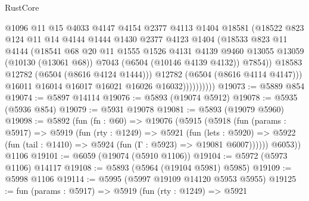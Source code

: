 \begin{lexlean}{RustCore}
\begin{coremodule}
                          @1096
                          @11
                          @15
                          @4033
                          @4147
                          @4154
                          @2377
                          @4113
                          @1404
                          @18581
                          (@18522
                            @823
                            @124
                            @11
                            @14
                            @4144
                            @1444
                            @1430
                            @2377
                            @4123
                            @1404
                            (@18533
                              @823
                              @11
                              @4144
                              (@18541
                                @68
                                @20
                                @11
                                @1555
                                @1526
                                @4131
                                @4139
                                @9460
                                @13055
                                @13059
                                (@10130 (@13061 @68))
                                @7043
                                (@6504 (@10146 @4139 @4132))
                                @7854))
                            @18583
                            @12782
                            (@6504 (@8616 @4124 @1444)))
                          @12782
                          (@6504 (@8616 @4114 @4147)))
                        @16011
                        @16014
                        @16017
                        @16021
                        @16026
                        @16032))))))))))
@19073 := @5889 @854
@19074 := @5897 @14114
@19076 := @5893 (@19074 @5912)
@19078 := @5935 (@5936 @854)
@19079 := @5931 @19078
@19081 := @5893 (@19079 @5960)
@19098 := @5892
    (fun (fn : @60) =>
    @19076
      (@5915
        (@5918
          (fun (params : @5917) =>
          @5919
            (fun (rty : @1249) =>
            @5921
              (fun (lets : @5920) =>
              @5922 (fun (tail : @1410) => @5924 (fun (Γ : @5923) => @19081 @6007))))))
        @6053))
    @1106
@19101 := @6059 (@19074 (@5910 @1106))
@19104 := @5972 (@5973 @1106) @14117
@19108 := @5893 (@5964 (@19104 @5981) @5985)
@19109 := @5998 @1106
@19114 := @5995 (@5997 @19109 @14120 @5953 @5955)
@19125 := fun (params : @5917) =>
  @5919
    (fun (rty : @1249) =>
    @5921

\end{coremodule}
\end{lexlean}
